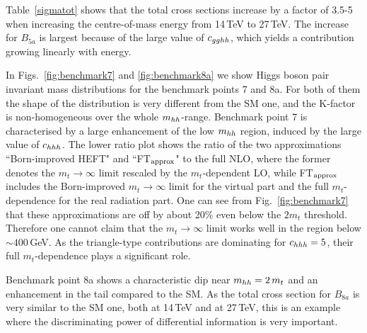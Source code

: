 %
Table~\ref{sigmatot} shows that the total cross sections increase by a factor of 3.5-5 when increasing the centre-of-mass energy from 14\,TeV to 27\,TeV. The increase for $B_{5a}$ is largest because of the large value of $c_{gghh}$, which yields a contribution growing linearly with energy.




In Figs.~\ref{fig:benchmark7} and \ref{fig:benchmark8a} we show Higgs boson pair invariant mass distributions for the benchmark points 7 and 8a. 
For both of them the shape of the distribution is very different from the SM one, and the K-factor is non-homogeneous over the whole $m_{hh}$-range. Benchmark point 7 is characterised by a large enhancement of the low $m_{hh}$ region, induced by the large value of $c_{hhh}$. The lower ratio plot shows the ratio of the two approximations ``Born-improved HEFT" and ``FT$_{\rm{approx}}$" to the full NLO, where the former denotes the $m_t\to\infty$ limit rescaled by the $m_t$-dependent LO, while FT$_{\rm{approx}}$ includes the Born-improved $m_t\to\infty$ limit for the virtual part and the full $m_t$-dependence for the real radiation part. One can see from Fig.~\ref{fig:benchmark7} that these approximations are off by about 20\% even below the $2m_t$ threshold. Therefore one cannot claim that the $m_t\to \infty$ limit works well in the region below $\sim 400$\,GeV. As the triangle-type contributions are dominating for $c_{hhh}=5$, their full $m_t$-dependence plays a significant role. 

Benchmark point 8a shows a characteristic dip near $m_{hh}=2\,m_t$ and an enhancement in the tail compared to the SM. 
As the total cross section for $B_{8a}$ is very similar to the SM one, both at 14\,TeV and at 27\,TeV, this is an example where the discriminating power of differential information is very important.

